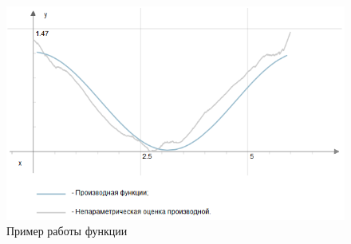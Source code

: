  \begin{figure} [h] 
   \center
   \includegraphics {HML_NonparametricEstimatorOfDerivative5.png}
   \caption{Пример работы функции} 
   \label{img:HML_NonparametricEstimatorOfDerivative5}  
 \end{figure}